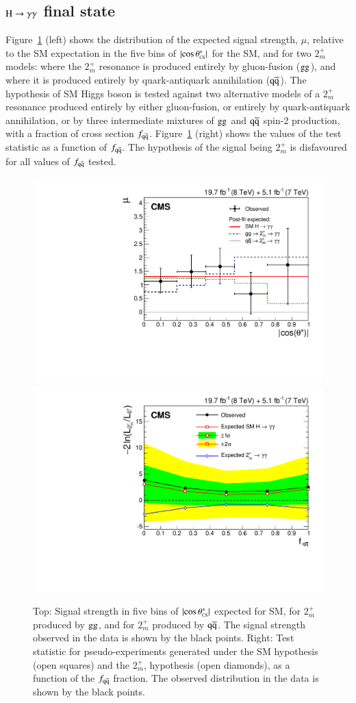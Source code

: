 \subsection{$\mathrm{H}\to\gamma\gamma$ final state}
\label{sec:exotic_hgg}

Figure~\ref{fig:hgg_spin2} (left) shows the distribution of the
expected signal strength, $\mu$, relative to the SM expectation in the
five bins of $|{\cos\theta^{\ast}_{\mbox{\tiny{CS}}}}|$ for the SM, and for two $2_m^+$ models:
where the $2_m^+$ resonance is produced entirely by gluon-fusion
($\mathrm{g}\mathrm{g}$), and where it is produced entirely by quark-antiquark
annihilation ($\mathrm{q}\mathrm{\overline{q}}$).  The hypothesis of SM Higgs boson is
tested against two alternative models of a $2_m^+$ resonance produced
entirely by either gluon-fusion, or entirely by quark-antiquark
annihilation, or by three intermediate mixtures of $\mathrm{g}\mathrm{g}$ and
$\mathrm{q}\mathrm{\overline{q}}$ spin-2 production, with a fraction of cross section
$f_{\mathrm{\mathrm{q}\mathrm{\overline{q}}}}$. Figure~\ref{fig:hgg_spin2} (right) shows the values of
the test statistic as a function of $f_{\mathrm{\mathrm{q}\mathrm{\overline{q}}}}$.  The hypothesis of the
signal being $2_m^+$ is disfavoured for all values of $f_{\mathrm{\mathrm{q}\mathrm{\overline{q}}}}$
tested.


\begin{figure}[!hbtp]
  \begin{center}
    \includegraphics[width=0.49\linewidth]{figures/hgg_mucosth.pdf}
    \includegraphics[width=0.49\linewidth]{figures/hgg_spin2_excl.pdf}
    \caption{Top: Signal strength in five bins of $|{\cos\theta^{\ast}_{\mbox{\tiny{CS}}}}|$ expected for SM, for $2^+_m$ produced
      by $\mathrm{g}\mathrm{g}$, and for $2^+_m$ produced by $\mathrm{\mathrm{q}\mathrm{\overline{q}}}$.
      The signal strength observed in the data is shown by the black points.
      Right: Test statistic for pseudo-experiments generated under the SM hypothesis (open squares) and the
$2^+_m$, hypothesis (open diamonds), as a function of the $f_{\mathrm{\mathrm{q}\mathrm{\overline{q}}}}$ fraction.
      The observed distribution in the data is shown by the black points.
      \label{fig:hgg_spin2}
    }
  \end{center}
\end{figure}



